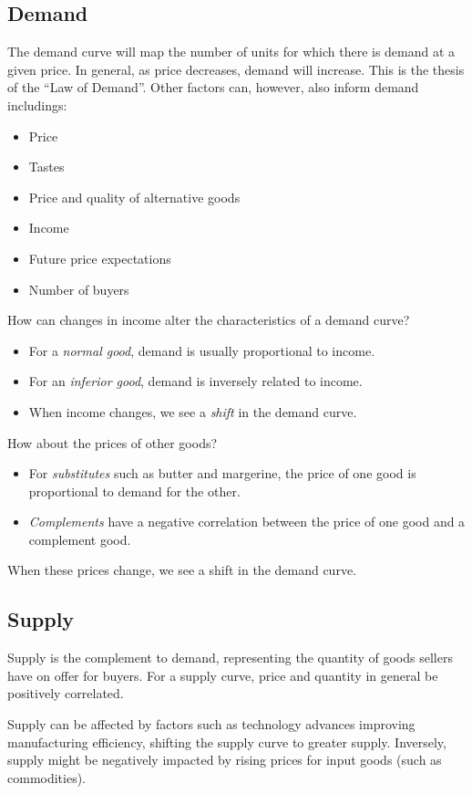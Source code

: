 \documentclass[12pt]{report}
\begin{document}
\subsection*{Demand}
The demand curve will map the number of units for which there is demand at a given price.
In general, as price decreases, demand will increase. This is the thesis of the ``Law of Demand''. 
Other factors can, however, also inform demand includings:
\begin{itemize}
    \item Price
    \item Tastes
    \item Price and quality of alternative goods
    \item Income
    \item Future price expectations
    \item Number of buyers
\end{itemize}
How can changes in income alter the characteristics of a demand curve?
\begin{itemize}
    \item For a \textit{normal good}, demand is usually proportional to income.
    \item For an \textit{inferior good}, demand is inversely related to income.
    \item When income changes, we see a \textit{shift} in the demand curve.
\end{itemize}
How about the prices of other goods?
\begin{itemize}
    \item For \textit{substitutes} such as butter and margerine, the price of one good is proportional to demand for the other.
    \item \textit{Complements} have a negative correlation between the price of one good and a complement good.
\end{itemize}
When these prices change, we see a shift in the demand curve.

\subsection*{Supply}
Supply is the complement to demand, representing the quantity of goods sellers have 
on offer for buyers. For a supply curve, price and quantity in general be positively correlated.

\bigskip
Supply can be affected by factors such as technology advances improving manufacturing
efficiency, shifting the supply curve to greater supply. Inversely, supply might be 
negatively impacted by rising prices for input goods (such as commodities).
\end{document}
